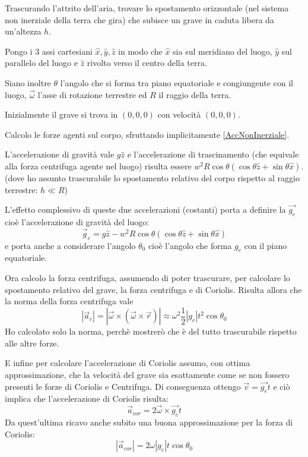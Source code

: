 \documentclass[../main.tex]{subfiles}
\begin{document}

\textex
Trascurando l'attrito dell'aria, trovare lo spostamento orizzontale (nel sistema non inerziale della terra che gira) che subisce un
grave in caduta libera da un'altezza $h$.


\solution
Pongo i 3 assi cartesiani $\hat{x}, \hat{y}, \hat{z}$ in modo che $\hat{x}$ sia sul meridiano del luogo, $\hat{y}$ sul parallelo del luogo
e $\hat{z}$ rivolto verso il centro della terra.

Siano inoltre $\theta$ l'angolo che si forma tra piano equatoriale e congiungente con il luogo, $\vec{\omega}$
l'asse di rotazione terrestre ed $R$ il raggio della terra.

Inizialmente il grave si trova in $(0,0,0)$ con velocità $(0,0,0)$.

Calcolo le forze agenti sul corpo, sfruttando implicitamente \cref{AccNonInerziale}.

L'accelerazione di gravità vale $g\hat{z}$ e l'accelerazione di trascinamento (che equivale
alla forza centrifuga agente nel luogo) risulta essere 
$w^2R\cos\theta\left(\cos\theta\hat{z}+\sin\theta\hat{x}\right)$. (dove ho assunto trascurabile lo spostamento relativo del corpo
rispetto al raggio terrestre: $h\ll R$)

L'effetto complessivo di queste due accelerazioni (costanti) porta a definire la $\vec{g_e}$ cioè l'accelerazione di gravità
del luogo:
\begin{equation}\label{cgt:geff}
	\vec g_e=g\hat{z}-w^2R\cos\theta\left(\cos\theta\hat{z}+\sin\theta\hat{x}\right)
\end{equation}
e porta anche a considerare l'angolo $\theta_0$ cioè l'angolo che forma $g_e$ con il piano equatoriale.

Ora calcolo la forza centrifuga, assumendo di poter trascurare, per calcolare lo spostamento relativo del grave,
la forza centrifuga e di Coriolis. Risulta allora che la norma della forza centrifuga vale
\begin{equation}\label{cgt:centrifuga}
	|\vec a_c|=|\vec{\omega}\times(\vec{\omega}\times \vec r) | \approx \omega^2\frac 12|g_e|t^2\cos \theta_0
\end{equation}
Ho calcolato solo la norma, perchè mostrerò che è del tutto trascurabile rispetto alle altre forze.

E infine per calcolare l'accelerazione di Coriolis assumo, con ottima approssimazione, che la velocità 
del grave sia esattamente come se non fossero presenti le forze di Coriolis e Centrifuga. Di conseguenza ottengo
$\vec{v}=\vec{g_e}t$ e ciò implica che l'accelerazione di Coriolis risulta:
\begin{equation}\label{cgt:Coriolis}
	\vec  a_{cor}=2\vec \omega \times \vec{g_e} t
\end{equation}
Da quest'ultima ricavo anche subito una buona approssimazione per la forza di Coriolis:
\begin{equation}\label{cgt:CoriolisApprox}
	|\vec a_{cor}| =2\omega|g_e| t\cos \theta_0 
\end{equation}
\end{document}
